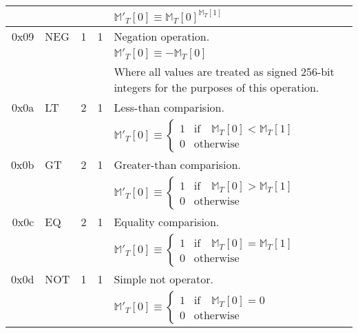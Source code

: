 \documentclass[9pt,oneside]{amsart}
\begin{document}
\begin{tabular*}{\columnwidth}[h]{rlrrl}
&&&& $\mathbb{M}'_T[0] \equiv \mathbb{M}_T[0] ^ {\mathbb{M}_T[1] }$ \\
\midrule
0x09 & {\small NEG} & 1 & 1 & Negation operation. \\
&&&& $\mathbb{M}'_T[0] \equiv -\mathbb{M}_T[0]$ \\
&&&& Where all values are treated as signed 256-bit integers for the purposes of this operation. \\
\midrule
0x0a & {\small LT} & 2 & 1 & Less-than comparision. \\
&&&& $\mathbb{M}'_T[0] \equiv \begin{cases} 1 & \text{if} \quad \mathbb{M}_T[0] < \mathbb{M}_T[1] \\ 0 & \text{otherwise} \end{cases}$ \\
\midrule
0x0b & {\small GT} & 2 & 1 & Greater-than comparision. \\
&&&& $\mathbb{M}'_T[0] \equiv \begin{cases} 1 & \text{if} \quad \mathbb{M}_T[0] > \mathbb{M}_T[1] \\ 0 & \text{otherwise} \end{cases}$ \\
\midrule
0x0c & {\small EQ} & 2 & 1 & Equality comparision. \\
&&&& $\mathbb{M}'_T[0] \equiv \begin{cases} 1 & \text{if} \quad \mathbb{M}_T[0] = \mathbb{M}_T[1] \\ 0 & \text{otherwise} \end{cases}$ \\
\midrule
0x0d & {\small NOT} & 1 & 1 & Simple not operator. \\
&&&& $\mathbb{M}'_T[0] \equiv \begin{cases} 1 & \text{if} \quad \mathbb{M}_T[0] = 0 \\ 0 & \text{otherwise} \end{cases}$ \\
\end{tabular*}
\end{document}
